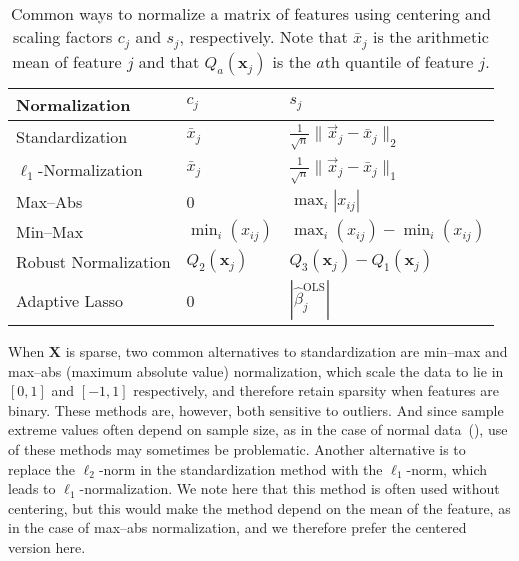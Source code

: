 \begin{table}[t]
  \centering
  \caption{
    Common ways to normalize a matrix of features using centering and scaling
    factors \(c_j\) and \(s_j\), respectively. Note that \(\bar{x}_j\) is
    the arithmetic mean of feature \(j\) and that \(Q_a(\bm{x}_j)\) is the
    \(a\)th quantile of feature \(j\).
  }
  \label{tab:normalization-types}
  \begin{tabular}{lll}
    \toprule
    Normalization            & \(c_{j}\)          & \(s_j\)                                                     \\
    \midrule
    Standardization          & \(\bar{x}_j\)      & \(\frac{1}{\sqrt{n}} \lVert \vec{x}_j - \bar{x}_j\rVert_2\) \\
    \addlinespace
    \(\ell_1\)-Normalization & \(\bar{x}_j\)      & \(\frac{1}{\sqrt{n}} \lVert \vec{x}_j - \bar{x}_j\rVert_1\) \\
    \addlinespace
    Max--Abs                 & 0                  & \(\max_i|x_{ij}|\)                                          \\
    \addlinespace
    Min--Max                 & \(\min_i(x_{ij})\) & \(\max_i(x_{ij}) - \min_i(x_{ij})\)                         \\
    \addlinespace
    Robust Normalization     & \(Q_2(\bm{x}_j)\)  & \(Q_3(\bm{x}_j) - Q_1(\bm{x}_j)\)                           \\
    \addlinespace
    Adaptive Lasso           & 0                  & \(|\hat{\beta}_j^\text{OLS}|\)                              \\
    \bottomrule
  \end{tabular}
\end{table}

When \(\bm{X}\) is sparse, two common alternatives to standardization are min--max and
max--abs (maximum absolute value) normalization, which scale the data to lie in \([0, 1]\)
and \([-1, 1]\) respectively, and therefore retain sparsity when features are binary. These
methods are, however, both sensitive to outliers. And since sample extreme values often
depend on sample size, as in the case of normal data~(), use of
these methods may sometimes be problematic. Another alternative is to replace the
\(\ell_2\)-norm in the standardization method with the \(\ell_1\)-norm, which leads to
\(\ell_1\)-normalization. We note here that this method is often used without centering,
but this would make the method depend on the mean of the feature, as in the case of
max--abs normalization, and we therefore prefer the centered version here.

